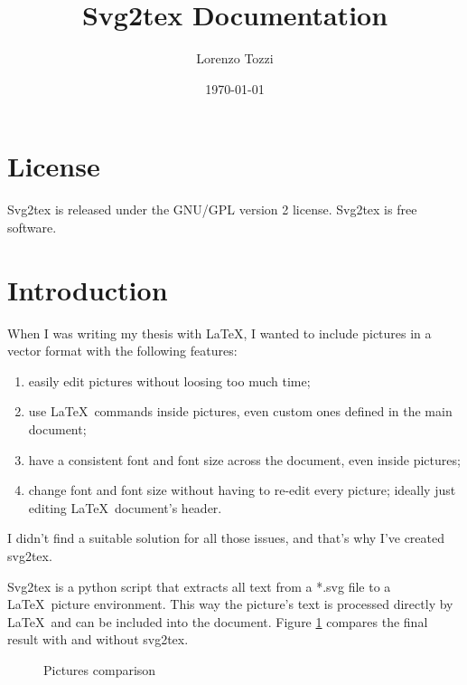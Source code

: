\documentclass[a4paper,12pt]{article}
\begin{document}
\title{Svg2tex Documentation}

\author{Lorenzo Tozzi}
\date{\today}
\maketitle

\tableofcontents

\section{License}

Svg2tex is released under the GNU/GPL version 2 license. Svg2tex is free software.

\section{Introduction}

When I was writing my thesis with \LaTeX , I wanted to include pictures in a vector format with the following features:
\begin{enumerate}
  \item easily edit pictures without loosing too much time;
  \item use \LaTeX\ commands inside pictures, even custom ones defined in the main document;
  \item have a consistent font and font size across the document, even inside pictures;
  \item change font and font size without having to re-edit every picture; ideally just editing \LaTeX\ document's header.
\end{enumerate}
I didn't find a suitable solution for all those issues, and that's why I've created svg2tex.

Svg2tex is a python script that extracts all text from a *.svg file to a \LaTeX\ picture environment. This way the picture's text is processed directly by \LaTeX\ and can be included into the document. Figure \ref{fig:comparison} compares the final result with and without svg2tex.
\begin{figure}[tb]
  \centering
  \caption{Pictures comparison}
  \label{fig:comparison}
\end{figure}
\end{document}
